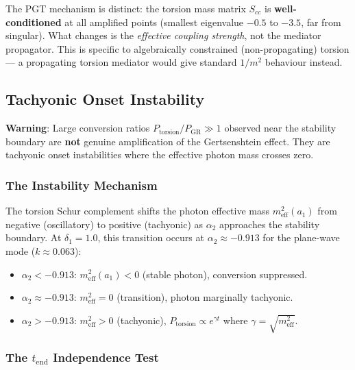 The PGT mechanism is distinct: the torsion mass matrix $S_{cc}$ is \textbf{well-conditioned} at all amplified points (smallest eigenvalue $-0.5$ to $-3.5$, far from singular). What changes is the \emph{effective coupling strength}, not the mediator propagator. This is specific to algebraically constrained (non-propagating) torsion --- a propagating torsion mediator would give standard $1/m^2$ behaviour instead.

\subsection{Tachyonic Onset Instability}
\label{subsec:tachyonic-instability}

\textbf{Warning}: Large conversion ratios $P_{\text{torsion}}/P_{\text{GR}} \gg 1$ observed near the stability boundary are \textbf{not} genuine amplification of the Gertsenshtein effect. They are tachyonic onset instabilities where the effective photon mass crosses zero.

\subsubsection{The Instability Mechanism}

The torsion Schur complement shifts the photon effective mass $m^2_{\text{eff}}(a_1)$ from negative (oscillatory) to positive (tachyonic) as $\alpha_2$ approaches the stability boundary. At $\delta_1 = 1.0$, this transition occurs at $\alpha_2 \approx -0.913$ for the plane-wave mode ($k \approx 0.063$):
\begin{itemize}
  \item $\alpha_2 < -0.913$: $m^2_{\text{eff}}(a_1) < 0$ (stable photon), conversion suppressed.
  \item $\alpha_2 \approx -0.913$: $m^2_{\text{eff}} = 0$ (transition), photon marginally tachyonic.
  \item $\alpha_2 > -0.913$: $m^2_{\text{eff}} > 0$ (tachyonic), $P_{\text{torsion}} \propto e^{\gamma t}$ where $\gamma = \sqrt{m^2_{\text{eff}}}$.
\end{itemize}

\subsubsection{The $t_{\text{end}}$ Independence Test}

